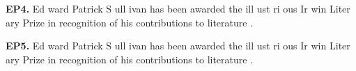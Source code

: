 \begin{mdframed}
\textbf{EP4.} \textcolor{Gray0}{Ed} \textcolor{Gray0}{ward} \textcolor{Gray0}{Patrick} \textcolor{Gray3}{S} \textcolor{Gray5}{ull} \textcolor{Gray1}{ivan} \textcolor{Gray0}{has} \textcolor{Gray0}{been} \textcolor{Gray0}{awarded} \textcolor{Gray1}{the} \textcolor{Gray0}{ill} \textcolor{Gray7}{ust} \textcolor{Gray1}{ri} \textcolor{Gray0}{ous} \textcolor{Gray0}{Ir} \textcolor{Gray1}{win} \textcolor{Gray1}{Liter} \textcolor{Gray2}{ary} \textcolor{Gray1}{Prize} \textcolor{Gray0}{in} \textcolor{Gray0}{recognition} \textcolor{Gray1}{of} \textcolor{Gray3}{his} \textcolor{Gray0}{contributions} \textcolor{Gray3}{to} \textcolor{Gray0}{literature} \textcolor{Gray1}{.} 

\textbf{EP5.} \textcolor{Gray0}{Ed} \textcolor{Gray0}{ward} \textcolor{Gray0}{Patrick} \textcolor{Gray1}{S} \textcolor{Gray4}{ull} \textcolor{Gray0}{ivan} \textcolor{Gray0}{has} \textcolor{Gray0}{been} \textcolor{Gray0}{awarded} \textcolor{Gray0}{the} \textcolor{Gray0}{ill} \textcolor{Gray4}{ust} \textcolor{Gray1}{ri} \textcolor{Gray0}{ous} \textcolor{Gray0}{Ir} \textcolor{Gray0}{win} \textcolor{Gray0}{Liter} \textcolor{Gray0}{ary} \textcolor{Gray0}{Prize} \textcolor{Gray0}{in} \textcolor{Gray0}{recognition} \textcolor{Gray0}{of} \textcolor{Gray1}{his} \textcolor{Gray0}{contributions} \textcolor{Gray1}{to} \textcolor{Gray0}{literature} \textcolor{Gray0}{.} 

\end{mdframed}